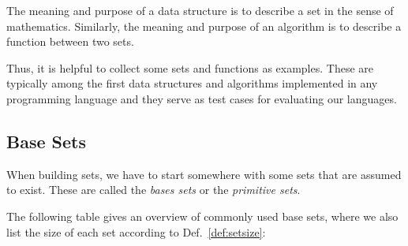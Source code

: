 The meaning and purpose of a data structure is to describe a set in the sense of mathematics.
Similarly, the meaning and purpose of an algorithm is to describe a function between two sets.

Thus, it is helpful to collect some sets and functions as examples.
These are typically among the first data structures and algorithms implemented in any programming language and they serve as test cases for evaluating our languages.

\subsection{Base Sets}\label{sec:math:sets:prim}

When building sets, we have to start somewhere with some sets that are assumed to exist.
These are called the \emph{bases sets} or the \emph{primitive sets}.

The following table gives an overview of commonly used base sets, where we also list the size of each set according to Def.~\ref{def:setsize}:

